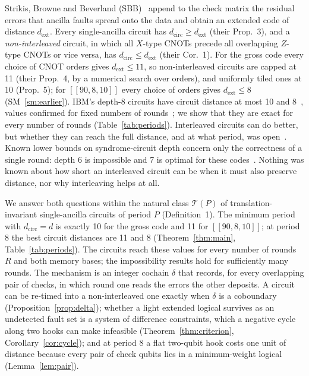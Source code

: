 \documentclass[aps,prl,twocolumn,superscriptaddress,nofootinbib]{revtex4-2}
\newcommand{\dcirc}{d_{\mathrm{circ}}}
\newcommand{\dext}{d_{\mathrm{ext}}}
\newcommand{\code}[1]{[[#1]]}
\newcommand{\T}{\mathcal{T}}
\begin{document}
Strikis, Browne and Beverland (SBB)~\cite{Strikis2026} append to the check matrix the
residual errors that ancilla faults spread onto the data and obtain an extended code of
distance $\dext$. Every single-ancilla circuit has $\dcirc\ge\dext$ (their Prop.~3), and
a \emph{non-interleaved} circuit, in which all $X$-type CNOTs precede all overlapping
$Z$-type CNOTs or vice versa, has $\dcirc\le\dext$ (their Cor.~1). For the gross code
every choice of CNOT orders gives $\dext\le11$, so non-interleaved circuits are capped at
11 (their Prop.~4, by a numerical search over orders), and uniformly tiled ones at 10
(Prop.~5); for $\code{90,8,10}$ every choice of orders gives $\dext\le8$
(SM~\ref{sm:earlier}). IBM's depth-8 circuits have circuit distance at most 10 and
8~\cite{Bravyi2024}, values confirmed for fixed numbers of
rounds~\cite{Tesseract2025,Crocker2026}; we show that they are exact for every number of
rounds (Table~\ref{tab:periods}). Interleaved circuits can do better, but whether
they can reach the full distance, and at what period, was open~\cite{Strikis2026}.
Known lower bounds on syndrome-circuit depth concern only the correctness of a single
round: depth 6 is impossible and 7 is optimal for these
codes~\cite{Li2025parity,Zhang2026ASC,DurazoRocha2026}.
Nothing was known about how short an interleaved circuit can be when it must also
preserve distance, nor why interleaving helps at all.

We answer both questions within the natural class $\T(P)$ of translation-invariant
single-ancilla circuits of period $P$ (Definition~1). The minimum period with $\dcirc=d$
is exactly 10 for the gross code and 11 for $\code{90,8,10}$; at period 8 the best
circuit distances are 11 and 8 (Theorem~\ref{thm:main}, Table~\ref{tab:periods}).
The circuits reach these values for every number of rounds $R$ and both memory bases; the
impossibility results hold for sufficiently many rounds. The mechanism is an integer
cochain $\delta$ that records, for every overlapping pair of checks, in which round one
reads the errors the other deposits. A circuit can be re-timed into a non-interleaved one
exactly when $\delta$ is a coboundary (Proposition~\ref{prop:delta}); whether a light
extended logical survives as an undetected fault set is a system of difference
constraints, which a negative cycle along two hooks can make infeasible
(Theorem~\ref{thm:criterion}, Corollary~\ref{cor:cycle}); and at period 8 a flat
two-qubit hook costs one unit of distance because every pair of check qubits lies in a
minimum-weight logical (Lemma~\ref{lem:pair}).
\end{document}
